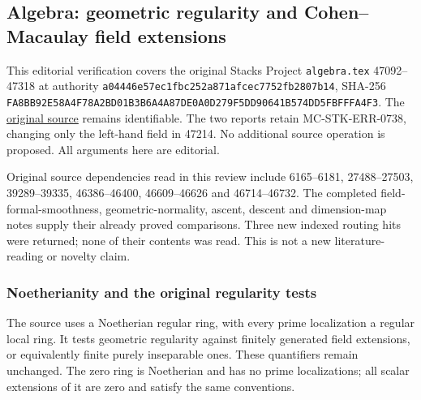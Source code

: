 \subsection{Algebra: geometric regularity and Cohen--Macaulay field extensions}\label{algebra-proof-071-algebra-geometric-regularity-and-cohenmacaulay-field-extensions}

This editorial verification covers the original Stacks Project \texttt{algebra.tex} 47092--47318 at authority \texttt{a044\allowbreak{}46e5\allowbreak{}7ec1\allowbreak{}fbc2\allowbreak{}52a8\allowbreak{}71af\allowbreak{}cec7\allowbreak{}752f\allowbreak{}b280\allowbreak{}7b14}, SHA-256 \texttt{FA8B\allowbreak{}B92E\allowbreak{}58A4\allowbreak{}F78A\allowbreak{}2BD0\allowbreak{}1B3B\allowbreak{}6A4A\allowbreak{}87DE\allowbreak{}0A0D\allowbreak{}279F\allowbreak{}5DD9\allowbreak{}0641\allowbreak{}B574\allowbreak{}DD5F\allowbreak{}BFFF\allowbreak{}A4F3}. The \href{https://github.com/stacks/stacks-project/blob/a04446e57ec1fbc252a871afcec7752fb2807b14/algebra.tex\#L47092}{original source} remains identifiable. The two reports retain MC-\AlgebraIdentifierBreak{}STK-\AlgebraIdentifierBreak{}ERR-\AlgebraIdentifierBreak{}0738, changing only the left-hand field in 47214. No additional source operation is proposed. All arguments here are editorial.

Original source dependencies read in this review include 6165--6181, 27488--27503, 39289--39335, 46386--46400, 46609--46626 and 46714--46732. The completed field-formal-smoothness, geometric-normality, ascent, descent and dimension-map notes supply their already proved comparisons. Three new indexed routing hits were returned; none of their contents was read. This is not a new literature-reading or novelty claim.

\subsubsection{Noetherianity and the original regularity tests}\label{algebra-proof-071-noetherianity-and-the-original-regularity-tests}

The source uses a Noetherian regular ring, with every prime localization a regular local ring. It tests geometric regularity against finitely generated field extensions, or equivalently finite purely inseparable ones. These quantifiers remain unchanged. The zero ring is Noetherian and has no prime localizations; all scalar extensions of it are zero and satisfy the same conventions.

